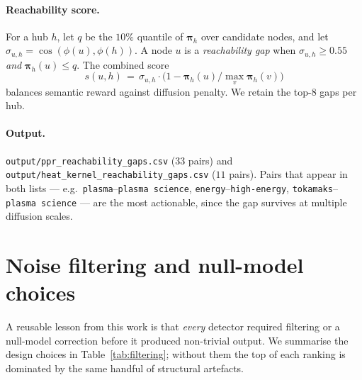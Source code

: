 \documentclass[11pt,a4paper]{article}
\newcommand{\code}[1]{\texttt{\small #1}}
\begin{document}
\paragraph{Reachability score.}
For a hub $h$, let $q$ be the $10\%$ quantile of $\boldsymbol{\pi}_h$ over candidate nodes, and let $\sigma_{u,h}=\cos(\phi(u),\phi(h))$. A node $u$ is a \emph{reachability gap} when $\sigma_{u,h}\geq 0.55$ \emph{and} $\boldsymbol{\pi}_h(u) \leq q$. The combined score
\[
s(u,h) \,=\, \sigma_{u,h} \cdot \bigl(1 - \boldsymbol{\pi}_h(u)/\max_v \boldsymbol{\pi}_h(v)\bigr)
\]
balances semantic reward against diffusion penalty. We retain the top-$8$ gaps per hub.

\paragraph{Output.} \code{output/ppr\_reachability\_gaps.csv} ($33$ pairs) and \code{output/heat\_kernel\_reachability\_gaps.csv} ($11$ pairs). Pairs that appear in both lists --- e.g.\ \code{plasma}--\code{plasma science}, \code{energy}--\code{high-energy}, \code{tokamaks}--\code{plasma science} --- are the most actionable, since the gap survives at multiple diffusion scales.

\section{Noise filtering and null-model choices}
\label{sec:filtering}

A reusable lesson from this work is that \emph{every} detector required filtering or a null-model correction before it produced non-trivial output. We summarise the design choices in Table~\ref{tab:filtering}; without them the top of each ranking is dominated by the same handful of structural artefacts.
\end{document}
